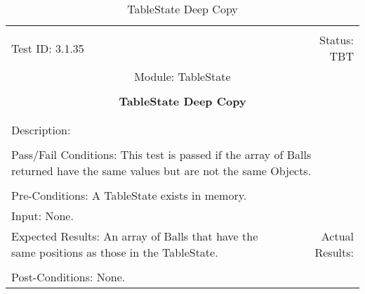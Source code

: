 \documentclass[titlepage]{article}
\begin{document}
\begin{center}%
\begin{table}
\begin{tabular}{|l r|}\hline&\\[-2mm]
	Test ID: 3.1.35	&Status: TBT\\[-3mm]
	\multicolumn{2}{|c|}{Module: TableState}\\&\\
	\multicolumn{2}{|c|}{\textbf{\large{TableState Deep Copy}}}\\&\\\hline&\\[-3mm]
	\multicolumn{2}{|p{\textwidth}|}{Description: }\\[1mm]\hline&\\[-3mm]
	\multicolumn{2}{|p{\textwidth}|}{Pass/Fail Conditions: This test is passed if the array of Balls returned have the same values but are not the same Objects.}\\[1mm]\hline&\\[-3mm]
	\multicolumn{2}{|p{\textwidth}|}{Pre-Conditions: A TableState exists in memory.}\\[4mm]
	\multicolumn{2}{|p{\textwidth}|}{Input: None.}\\[2mm]\hline
	\multicolumn{1}{|p{0.49\textwidth}}{Expected Results: An array of Balls that have the same positions as those in the TableState.}	&\multicolumn{1}{|p{0.45\textwidth}|}{Actual Results: }\\\hline&\\[-3mm]
	\multicolumn{2}{|p{\textwidth}|}{Post-Conditions: None.}\\\hline
\end{tabular}
\caption{TableState Deep Copy}
\end{table}
\end{center}
\end{document}
